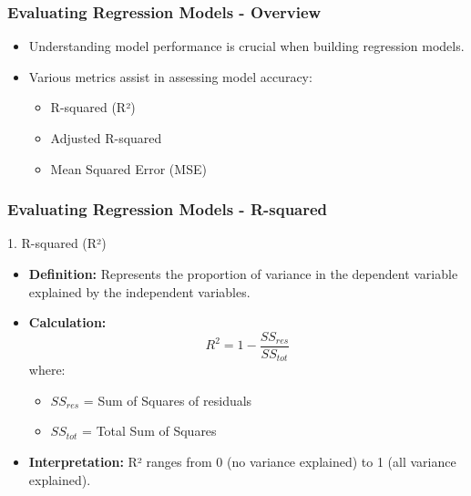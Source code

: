 \documentclass[aspectratio=169]{beamer}
\begin{document}
\begin{frame}[fragile]
    \frametitle{Evaluating Regression Models - Overview}
    \begin{itemize}
        \item Understanding model performance is crucial when building regression models.
        \item Various metrics assist in assessing model accuracy:
        \begin{itemize}
            \item R-squared (R²)
            \item Adjusted R-squared
            \item Mean Squared Error (MSE)
        \end{itemize}
    \end{itemize}
\end{frame}

\begin{frame}[fragile]
    \frametitle{Evaluating Regression Models - R-squared}
    \begin{block}{1. R-squared (R²)}
        \begin{itemize}
            \item \textbf{Definition:} Represents the proportion of variance in the dependent variable explained by the independent variables.
            \item \textbf{Calculation:}
            \begin{equation}
                R^2 = 1 - \frac{SS_{res}}{SS_{tot}}
            \end{equation}
            where:
            \begin{itemize}
                \item \(SS_{res}\) = Sum of Squares of residuals
                \item \(SS_{tot}\) = Total Sum of Squares
            \end{itemize}
            \item \textbf{Interpretation:} R² ranges from 0 (no variance explained) to 1 (all variance explained).
        \end{itemize}
    \end{block}
\end{frame}
\end{document}
